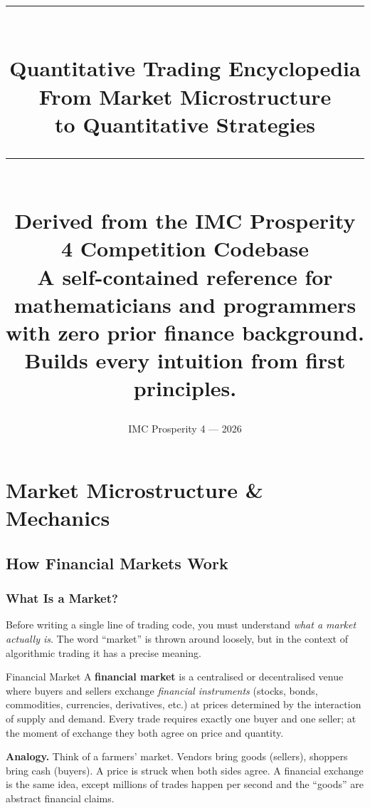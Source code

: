\documentclass[12pt,a4paper,openany]{report}
\title{
  \vspace{1.5cm}
  \rule{\linewidth}{1.5pt}\\[0.6cm]
  {\Huge\bfseries Quantitative Trading Encyclopedia}\\[0.5cm]
  {\Large From Market Microstructure\\to Quantitative Strategies}\\[0.4cm]
  \rule{\linewidth}{1.5pt}\\[1cm]
  {\large Derived from the IMC Prosperity 4 Competition Codebase}\\[0.6cm]
  {\normalsize A self-contained reference for mathematicians and programmers\\
  with zero prior finance background.\\[0.3cm]
  Builds every intuition from first principles.}
}
\author{}
\date{IMC Prosperity 4 --- 2026}
\theoremstyle{definition}
\begin{document}

\maketitle
\thispagestyle{empty}
\newpage

\begingroup
\titlespacing*{\chapter}{0pt}{0pt}{0pt}
\tableofcontents
\endgroup
\newpage

%
%
\part{Market Microstructure \& Mechanics}

\chapter{How Financial Markets Work}

\section{What Is a Market?}

Before writing a single line of trading code, you must understand \emph{what a market actually is}. The word ``market'' is thrown around loosely, but in the context of algorithmic trading it has a precise meaning.

\begin{definitionbox}{Financial Market}
A \textbf{financial market} is a centralised or decentralised venue where buyers and sellers exchange \emph{financial instruments} (stocks, bonds, commodities, currencies, derivatives, etc.) at prices determined by the interaction of supply and demand.  Every trade requires exactly one buyer and one seller; at the moment of exchange they both agree on price and quantity.
\end{definitionbox}

\noindent\textbf{Analogy.} Think of a farmers' market. Vendors bring goods (sellers), shoppers bring cash (buyers). A price is struck when both sides agree. A financial exchange is the same idea, except millions of trades happen per second and the ``goods'' are abstract financial claims.
\end{document}

